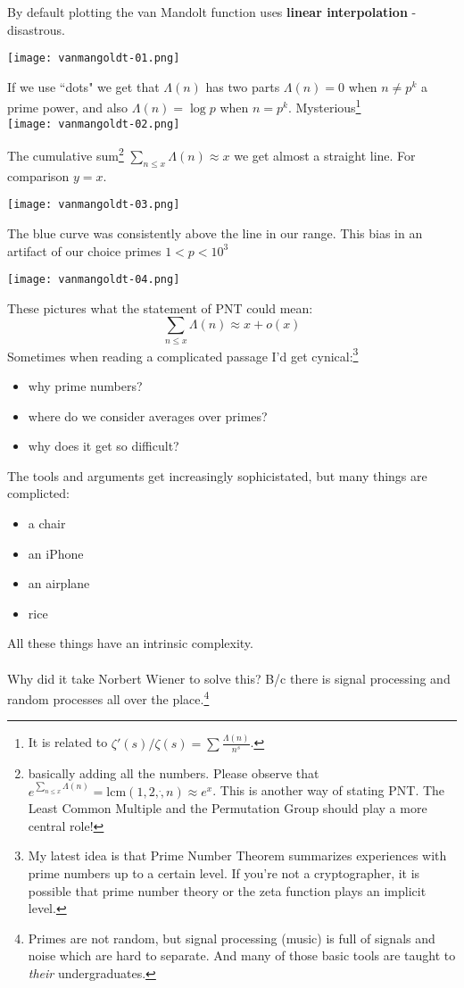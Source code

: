 \documentclass[12pt]{article}
\begin{document}
\newpage 

\noindent By default plotting the van Mandolt function uses \textbf{linear interpolation} - disastrous.

\texttt{[image: vanmangoldt-01.png]}  

\noindent If we use ``dots" we get that $\Lambda(n)$ has two parts $\Lambda(n) = 0$ when $n \neq p^k$ a prime power, and also $\Lambda(n) = \log p$ when $n = p^k$.  Mysterious\footnote{It is related to $\zeta'(s)/\zeta(s)= \sum \frac{\Lambda(n)}{n^s}$.}\\
\texttt{[image: vanmangoldt-02.png]} 

\newpage

\noindent The cumulative sum\footnote{basically adding all the numbers.  Please observe that $e^{\sum_{n \leq x} \Lambda(n)} = \mathrm{lcm}(1,2,\dot, n) \approx e^x$. This is another way of stating PNT.  The Least Common Multiple and the Permutation Group should play a more central role! } $\sum_{n \leq x} \Lambda(n) \approx x$ we get almost a straight line. For comparison $y=x$.

\texttt{[image: vanmangoldt-03.png]}  

\noindent The blue curve was consistently above the line in our range.  This bias in an artifact of our choice primes $1 < p < 10^3$

\texttt{[image: vanmangoldt-04.png]}  

\newpage

\noindent These pictures what the statement of PNT could mean:
$$ \sum_{n \leq x} \Lambda(n) \approx x + o(x)$$
Sometimes when reading a complicated passage I'd get cynical:\footnote{My latest idea is that Prime Number Theorem summarizes experiences with prime numbers up to a certain level.  If you're not a cryptographer, it is possible that prime number theory or the zeta function plays an implicit level.}
\begin{itemize}
\item why prime numbers?
\item where do we consider averages over primes?
\item why does it get so difficult? 
\end{itemize}
The tools and arguments get increasingly sophicistated, but many things are complicted:
\begin{itemize}
\item a chair
\item an iPhone
\item an airplane
\item rice
\end{itemize}
All these things have an intrinsic complexity.  \\ \\
Why did it take Norbert Wiener to solve this?  B/c there is signal processing and random processes all over the place.\footnote{Primes are not random, but signal processing (music) is full of signals and noise which are hard to separate.  And many of those basic tools are taught to \textit{their} undergraduates.}
\end{document}
